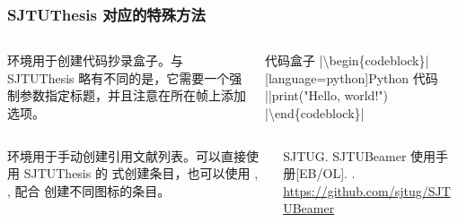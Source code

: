 \begin{frame}[fragile]
  \frametitle{SJTUThesis 对应的特殊方法}
  \begin{columns}
    \begin{column}{0.55\textwidth}
       环境用于创建代码抄录盒子。与 SJTUThesis 略有不同的是，它需要一个强制参数指定标题，并且注意在所在帧上添加  选项。
    \end{column}
    \begin{column}{0.45\textwidth}
      \begin{codeblock}{代码盒子}
|\textbackslash{}begin\{codeblock\}|[language=python]{Python 代码}
||print("Hello, world!")
|\textbackslash{}end\{codeblock\}|
      \end{codeblock}
    \end{column}
  \end{columns}


  \begin{columns}
    \begin{column}{0.55\textwidth}
       环境用于手动创建引用文献列表。可以直接使用 SJTUThesis 的  式创建条目，也可以使用 , ,  配合  创建不同图标的条目。
    \end{column}
    \begin{column}{0.45\textwidth}
      \begin{bibliolist}{00}
        \onlineitem SJTUG.
        \newblock SJTUBeamer 使用手册[EB/OL].
        . \url{https://github.com/sjtug/SJTUBeamer}
      \end{bibliolist}
    \end{column}
  \end{columns}

\end{frame}

